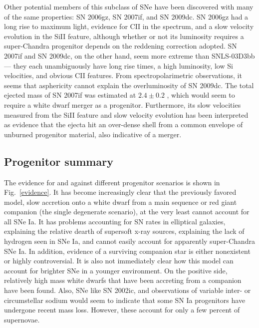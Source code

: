 \documentclass{nature1}
\begin{document}
Other potential members of this subclass of SNe have been discovered
with many of the same properties: SN
2006gz\citep{2007ApJ...669L..17H}, SN
2007if\citep{2010ApJ...713.1073S,2010ApJ...715.1338Y}, and SN
2009dc\citep{2010ApJ...714.1209T,2009ApJ...707L.118Y,2010arXiv1003.2417S}.
SN 2006gz had a long rise to maximum light, evidence for CII in the
spectrum, and a slow velocity evolution in the SiII feature, although
whether or not its luminosity requires a super-Chandra progenitor
depends on the reddening correction adopted.  SN 2007if and SN 2009dc,
on the other hand, seem more extreme than SNLS-03D3bb --- they each
unambiguously have long rise times, a high luminosity, low Si
velocities, and obvious CII features.  From spectropolarimetric
observations, it seems that asphericity cannot explain the
overluminosity of SN 2009dc\citep{2010ApJ...714.1209T}.  The total
ejected mass of SN 2007if was estimated at $2.4\pm 0.2$ \Msun , which
would seem to require a white dwarf merger as a
progenitor\citep{2010ApJ...713.1073S}.  Furthermore, its slow
velocities measured from the SiII feature and slow velocity evolution
has been interpreted as evidence that the ejecta hit an over-dense
shell from a common envelope of unburned progenitor material, also
indicative of a merger\citep{2010ApJ...713.1073S}.

\subsection{Progenitor summary}
The evidence for and against different progenitor scenarios is shown
in Fig.~\ref{evidence}.  It has become
increasingly clear that the previously favored model, slow accretion
onto a white dwarf from a main sequence or red giant companion (the
single degenerate scenario), at the very least cannot account for all
SNe Ia.  It has problems accounting for SN rates in elliptical
galaxies, explaining the relative dearth of supersoft x-ray sources,
explaining the lack of hydrogen seen in SNe Ia, and cannot easily
account for apparently super-Chandra SNe Ia.  In addition, evidence of
a surviving companion star is either nonexistent or highly
controversial.  It is also not immediately clear how this model can
account for brighter SNe in a younger environment.  On the positive
side, relatively high mass white dwarfs that have been accreting from
a companion have been found\citep{2007NewAR..51..524P}.  Also, SNe
like SN 2002ic, and observations of variable inter- or circumstellar
sodium would seem to indicate that some SN Ia progenitors have
undergone recent mass loss.  However, these account for only a few
percent of supernovae.
\end{document}
